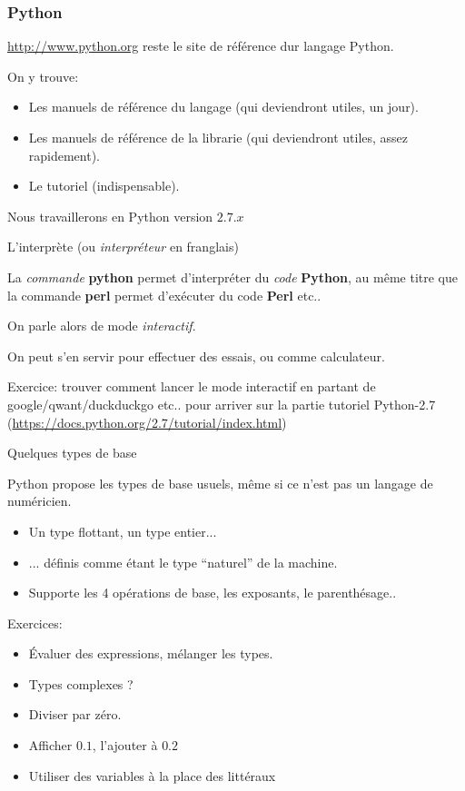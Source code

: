 \documentclass{beamer}
\begin{document}
\begin{frame}\frametitle{Python}
  \url{http://www.python.org} reste le site de référence dur langage Python.

  On y trouve:
  \begin{itemize}
  \item Les manuels de référence du langage (qui deviendront utiles, un jour).
  \item Les manuels de référence de la librarie (qui deviendront utiles, assez rapidement).
  \item Le tutoriel (indispensable).
  \end{itemize}
  
  Nous travaillerons en Python version $2.7.x$

\end{frame}

\begin{frame}{L'interprète}
(ou {\em interpréteur} en franglais)

La {\em commande} {\bf python} permet d'interpréter du {\em code} {\bf Python}, au même titre que la commande {\bf perl} permet d'exécuter du code {\bf Perl} etc.. 

On parle alors de mode {\em interactif}.

On peut s'en servir pour effectuer des essais, ou comme calculateur.

Exercice: trouver comment lancer le mode interactif en partant de google/qwant/duckduckgo etc..  pour arriver sur la partie tutoriel Python-2.7 (\url{https://docs.python.org/2.7/tutorial/index.html})


\end{frame}

\begin{frame}{Quelques types de base}

  Python propose les types de base usuels, même si ce n'est pas un langage de numéricien.
  \begin{itemize}
  \item Un type flottant, un type entier...
  \item ... définis comme étant le type ``naturel'' de la machine.
  \item Supporte les 4 opérations de base, les exposants, le parenthésage..
  \end{itemize}
  Exercices:
  \begin{itemize}
  \item Évaluer des expressions, mélanger les types.
  \item Types complexes ?
  \item Diviser par zéro.
  \item Afficher $0.1$, l'ajouter à $0.2$
  \item Utiliser des variables à la place des littéraux
  \end{itemize}
\end{frame}
\end{document}
